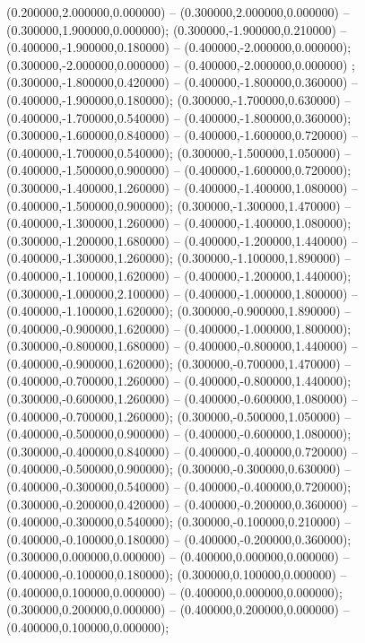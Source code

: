  (0.200000,2.000000,0.000000) -- (0.300000,2.000000,0.000000) -- (0.300000,1.900000,0.000000);
 (0.300000,-1.900000,0.210000) -- (0.400000,-1.900000,0.180000) -- (0.400000,-2.000000,0.000000);
 (0.300000,-2.000000,0.000000) -- (0.400000,-2.000000,0.000000) ;
 (0.300000,-1.800000,0.420000) -- (0.400000,-1.800000,0.360000) -- (0.400000,-1.900000,0.180000);
 (0.300000,-1.700000,0.630000) -- (0.400000,-1.700000,0.540000) -- (0.400000,-1.800000,0.360000);
 (0.300000,-1.600000,0.840000) -- (0.400000,-1.600000,0.720000) -- (0.400000,-1.700000,0.540000);
 (0.300000,-1.500000,1.050000) -- (0.400000,-1.500000,0.900000) -- (0.400000,-1.600000,0.720000);
 (0.300000,-1.400000,1.260000) -- (0.400000,-1.400000,1.080000) -- (0.400000,-1.500000,0.900000);
 (0.300000,-1.300000,1.470000) -- (0.400000,-1.300000,1.260000) -- (0.400000,-1.400000,1.080000);
 (0.300000,-1.200000,1.680000) -- (0.400000,-1.200000,1.440000) -- (0.400000,-1.300000,1.260000);
 (0.300000,-1.100000,1.890000) -- (0.400000,-1.100000,1.620000) -- (0.400000,-1.200000,1.440000);
 (0.300000,-1.000000,2.100000) -- (0.400000,-1.000000,1.800000) -- (0.400000,-1.100000,1.620000);
 (0.300000,-0.900000,1.890000) -- (0.400000,-0.900000,1.620000) -- (0.400000,-1.000000,1.800000);
 (0.300000,-0.800000,1.680000) -- (0.400000,-0.800000,1.440000) -- (0.400000,-0.900000,1.620000);
 (0.300000,-0.700000,1.470000) -- (0.400000,-0.700000,1.260000) -- (0.400000,-0.800000,1.440000);
 (0.300000,-0.600000,1.260000) -- (0.400000,-0.600000,1.080000) -- (0.400000,-0.700000,1.260000);
 (0.300000,-0.500000,1.050000) -- (0.400000,-0.500000,0.900000) -- (0.400000,-0.600000,1.080000);
 (0.300000,-0.400000,0.840000) -- (0.400000,-0.400000,0.720000) -- (0.400000,-0.500000,0.900000);
 (0.300000,-0.300000,0.630000) -- (0.400000,-0.300000,0.540000) -- (0.400000,-0.400000,0.720000);
 (0.300000,-0.200000,0.420000) -- (0.400000,-0.200000,0.360000) -- (0.400000,-0.300000,0.540000);
 (0.300000,-0.100000,0.210000) -- (0.400000,-0.100000,0.180000) -- (0.400000,-0.200000,0.360000);
 (0.300000,0.000000,0.000000) -- (0.400000,0.000000,0.000000) -- (0.400000,-0.100000,0.180000);
 (0.300000,0.100000,0.000000) -- (0.400000,0.100000,0.000000) -- (0.400000,0.000000,0.000000);
 (0.300000,0.200000,0.000000) -- (0.400000,0.200000,0.000000) -- (0.400000,0.100000,0.000000);
